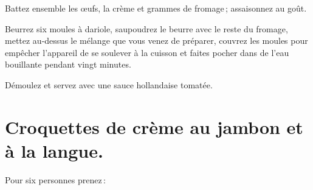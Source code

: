 Battez ensemble les œufs, la crème et {\mmm} grammes de fromage ; assaisonnez au
goût.

Beurrez six moules à dariole, saupoudrez le beurre avec le reste du fromage,
mettez au-dessus le mélange que vous venez de préparer, couvrez les moules pour
empêcher l'appareil de se soulever à la cuisson et faites pocher dans de l'eau
bouillante pendant vingt minutes.

Démoulez et servez avec une sauce hollandaise tomatée.

\section*{\centering Croquettes de crème au jambon et à la langue.}

Pour six personnes prenez :

\medskip


